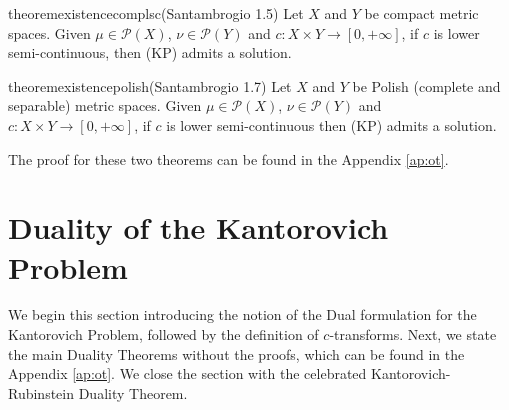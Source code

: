 \begin{restatable}{theorem}{existencecomplsc}(Santambrogio 1.5)
  \label{teo1.5}
  Let $X$ and $Y$ be compact metric spaces.
  Given $\mu\in \mathcal{P}(X)$, $\nu \in \mathcal P(Y)$ and
  $c:X\times Y \to[0,+\infty]$, if $c$ is lower semi-continuous, then
  (KP) admits a solution.
\end{restatable}

\begin{restatable}{theorem}{existencepolish}(Santambrogio 1.7)
  Let $X$ and $Y$ be Polish (complete and separable) metric spaces.
  Given $\mu\in \mathcal{P}(X)$, $\nu \in \mathcal P(Y)$ and
  $c:X\times Y \to[0,+\infty]$, if $c$ is lower semi-continuous then
  (KP) admits a solution.
  \label{thm:existanceKPpolish}
\end{restatable}

The proof for these two theorems can be found in the Appendix \ref{ap:ot}.

\section{Duality of the Kantorovich Problem}

We begin this section introducing the notion of the Dual formulation
for the Kantorovich Problem, followed by 
the definition of $c$-transforms.
Next, we state the main Duality Theorems without the proofs,
which can be found in the Appendix \ref{ap:ot}. We close the section
with the celebrated Kantorovich-Rubinstein Duality Theorem.

